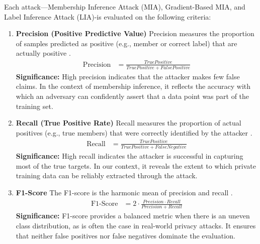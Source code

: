 \documentclass[conference]{IEEEtran}
\begin{document}
Each attack—Membership Inference Attack (MIA), Gradient-Based MIA, and Label Inference Attack (LIA)-is evaluated on the following criteria:
\begin{enumerate}
    \item \textbf{Precision (Positive Predictive Value)}
    \newline
    Precision measures the proportion of samples predicted as positive (e.g., member or correct label) that are actually positive \cite{pre64}.
    \newline
    \begin{align}
      \text{Precision} &= \frac{True Positive}{True Positive + False Positive} \nonumber
    \end{align}
    \newline
    \textbf{Significance:} High precision indicates that the attacker makes few false claims. In the context of membership inference, it reflects the accuracy with which an adversary can confidently assert that a data point was part of the training set.
    \item \textbf{Recall (True Positive Rate)}
    \newline
    Recall measures the proportion of actual positives (e.g., true members) that were correctly identified by the attacker \cite{pre64}.
    \newline
    \begin{align}
      \text{Recall} &= \frac{True Positive}{True Positive + False Negative} \nonumber
    \end{align}
    \newline
    \textbf{Significance:} High recall indicates the attacker is successful in capturing most of the true targets. In our context, it reveals the extent to which private training data can be reliably extracted through the attack.
    \item \textbf{F1-Score}
    \newline
    The F1-score is the harmonic mean of precision and recall \cite{fscore65}.
    \newline
    \begin{align}
      \text{F1-Score} &= 2 \cdot \frac{Precision \cdot Recall}{Precision + Recall} \nonumber
    \end{align}
    \newline
    \textbf{Significance:} F1-score provides a balanced metric when there is an uneven class distribution, as is often the case in real-world privacy attacks. It ensures that neither false positives nor false negatives dominate the evaluation.

\end{enumerate}
\end{document}
